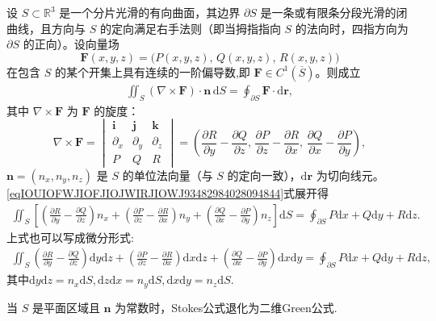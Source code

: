 \documentclass[../../main.tex]{subfiles}%
\begin{document}
\begin{theorem}[Stokes公式]\label{theorem:Stokes(斯托克斯)公式--数分}
设 $S \subset \mathbb{R}^3$ 是一个分片光滑的有向曲面，其边界 $\partial S$ 是一条或有限条分段光滑的闭曲线，且方向与 $S$ 的定向满足右手法则（即当拇指指向 $S$ 的法向时，四指方向为 $\partial S$ 的正向）。设向量场
\[
\bm{F}(x,y,z) = \bigl( P(x,y,z),\, Q(x,y,z),\, R(x,y,z) \bigr)
\]
在包含 $S$ 的某个开集上具有连续的一阶偏导数,即 $\bm{F}\in C^1(\overline{S})$。则成立
\begin{align}\label{eqIOUIOFWJIOFJIOJWIRJIOWJ93482984028094844}
\iint_{S} (\nabla \times \bm{F}) \cdot \bm{n} \, \mathrm{d}S
= \oint_{\partial S} \bm{F}\cdot \mathrm{d}\bm{r},
\end{align}
其中 $\nabla \times \bm{F}$ 为 $\bm{F}$ 的旋度：
\[
\nabla \times \bm{F}= 
\begin{vmatrix}
\mathbf{i} & \mathbf{j} & \mathbf{k} \\
\partial_x & \partial_y & \partial_z \\
P & Q & R
\end{vmatrix}
= \left( \frac{\partial R}{\partial y} - \frac{\partial Q}{\partial z},\,
\frac{\partial P}{\partial z} - \frac{\partial R}{\partial x},\,
\frac{\partial Q}{\partial x} - \frac{\partial P}{\partial y} \right),
\]
$\bm{n}=(n_x,n_y,n_z)$ 是 $S$ 的单位法向量（与 $S$ 的定向一致），$\mathrm{d}\bm{r}$ 为切向线元。\eqref{eqIOUIOFWJIOFJIOJWIRJIOWJ93482984028094844}式展开得
\begin{align*}
\iint_S{\left[ \left( \frac{\partial R}{\partial y}-\frac{\partial Q}{\partial z} \right) n_x+\left( \frac{\partial P}{\partial z}-\frac{\partial R}{\partial x} \right) n_y+\left( \frac{\partial Q}{\partial x}-\frac{\partial P}{\partial y} \right) n_z \right] \mathrm{d}S}=\oint_{\partial S}{P\mathrm{d}x+Q\mathrm{d}y+R\mathrm{d}z}.
\end{align*}
上式也可以写成微分形式:
\begin{align*}
\iint_S{\left( \frac{\partial R}{\partial y}-\frac{\partial Q}{\partial z} \right) \mathrm{d}y\mathrm{d}z+\left( \frac{\partial P}{\partial z}-\frac{\partial R}{\partial x} \right) \mathrm{d}x\mathrm{d}z+\left( \frac{\partial Q}{\partial x}-\frac{\partial P}{\partial y} \right) \mathrm{d}x\mathrm{d}y}=\oint_{\partial S}{P\mathrm{d}x+Q\mathrm{d}y+R\mathrm{d}z},
\end{align*}
其中$\mathrm{d}y\mathrm{d}z=n_x\mathrm{d}S,  \mathrm{d}z\mathrm{d}x=n_y\mathrm{d}S,  \mathrm{d}x\mathrm{d}y=n_z\mathrm{d}S$.
\end{theorem}
\begin{remark}
当 $S$ 是平面区域且 $\bm{n}$ 为常数时，Stokes公式退化为二维Green公式.
\end{remark}
\end{document}
